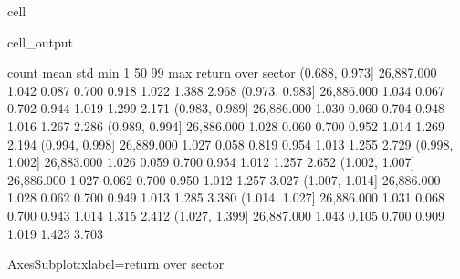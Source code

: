 \documentclass[letterpaper,10pt,english]{jupyterBook}
\begin{document}
\begin{sphinxuseclass}{cell}
\begin{sphinxVerbatimOutput}
\begin{sphinxuseclass}{cell_output}
\begin{sphinxVerbatim}[commandchars=\\\{\}]
                        count  mean   std   min    1\PYGZpc{}   50\PYGZpc{}   99\PYGZpc{}   max
return over sector                                                     
(0.688, 0.973]     26,887.000 1.042 0.087 0.700 0.918 1.022 1.388 2.968
(0.973, 0.983]     26,886.000 1.034 0.067 0.702 0.944 1.019 1.299 2.171
(0.983, 0.989]     26,886.000 1.030 0.060 0.704 0.948 1.016 1.267 2.286
(0.989, 0.994]     26,886.000 1.028 0.060 0.700 0.952 1.014 1.269 2.194
(0.994, 0.998]     26,889.000 1.027 0.058 0.819 0.954 1.013 1.255 2.729
(0.998, 1.002]     26,883.000 1.026 0.059 0.700 0.954 1.012 1.257 2.652
(1.002, 1.007]     26,886.000 1.027 0.062 0.700 0.950 1.012 1.257 3.027
(1.007, 1.014]     26,886.000 1.028 0.062 0.700 0.949 1.013 1.285 3.380
(1.014, 1.027]     26,886.000 1.031 0.068 0.700 0.943 1.014 1.315 2.412
(1.027, 1.399]     26,887.000 1.043 0.105 0.700 0.909 1.019 1.423 3.703
\end{sphinxVerbatim}

\begin{sphinxVerbatim}[commandchars=\\\{\}]
\PYGZlt{}AxesSubplot:xlabel=\PYGZsq{}return over sector\PYGZsq{}\PYGZgt{}
\end{sphinxVerbatim}

\noindent{}

\end{sphinxuseclass}\end{sphinxVerbatimOutput}

\end{sphinxuseclass}






\renewcommand{\indexname}{Index}
\printindex
\end{document}
